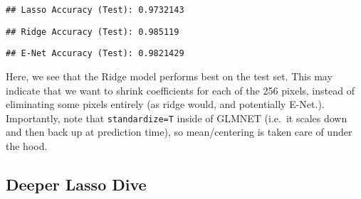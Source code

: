 \documentclass[
]{article}
\newenvironment{Shaded}{\begin{snugshade}}{\end{snugshade}}
\newcommand{\FunctionTok}[1]{\textcolor[rgb]{0.00,0.00,0.00}{#1}}
\newcommand{\NormalTok}[1]{#1}
\newcommand{\SpecialCharTok}[1]{\textcolor[rgb]{0.00,0.00,0.00}{#1}}
\newcommand{\StringTok}[1]{\textcolor[rgb]{0.31,0.60,0.02}{#1}}
\begin{document}
\begin{Shaded}
\end{Shaded}

\begin{verbatim}
## Lasso Accuracy (Test): 0.9732143
\end{verbatim}

\begin{Shaded}
\end{Shaded}

\begin{verbatim}
## Ridge Accuracy (Test): 0.985119
\end{verbatim}

\begin{Shaded}
\end{Shaded}

\begin{verbatim}
## E-Net Accuracy (Test): 0.9821429
\end{verbatim}

Here, we see that the Ridge model performs best on the test set. This
may indicate that we want to shrink coefficients for each of the 256
pixels, instead of eliminating some pixels entirely (as ridge would, and
potentially E-Net.). Importantly, note that \texttt{standardize=T}
inside of GLMNET (i.e.~it scales down and then back up at prediction
time), so mean/centering is taken care of under the hood.

\hypertarget{deeper-lasso-dive}{%
\subsection{Deeper Lasso Dive}\label{deeper-lasso-dive}}
\end{document}
